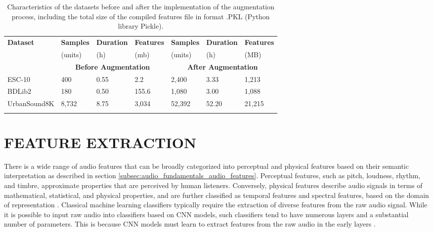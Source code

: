 \begin{table}[ht!]
    \caption[Comparison between the original datasets and their augmented versions]{Characteristics of the datasets before and after the implementation of the augmentation process, including the total size of the compiled features file in format .PKL (Python library Pickle).}
    \label{table:summary_datasets_before_and_after_augmentation}
    \centering
    \begin{tabular}{p{2.7cm}|p{1.6cm}|p{1.7cm}|p{1.7cm}|p{1.6cm}|p{1.7cm}|p{1.7cm}}
        \Xhline{2\arrayrulewidth} 
        \rowcolor{lightgray}
        \textbf{Dataset} & \hfil\textbf{Samples} & \hfil\textbf{Duration} & \hfil\textbf{Features} & \hfil\textbf{Samples} & \hfil\textbf{Duration} & \hfil\textbf{Features}\\
        \rowcolor{lightgray}
          & \hfil (units) & \hfil (h) & \hfil (\gls{m}\gls{b}) & \hfil(units) & \hfil(h) & \hfil(MB)\\    
        \Xhline{2\arrayrulewidth}
        \rowcolor{gray!20} & \multicolumn{3}{c|}{\textbf{Before Augmentation}} & \multicolumn{3}{c}{\textbf{After Augmentation}} \\
        \hline
        ESC-10 & \hfil 400 & \hfil 0.55 & \hfil 2.2 & \hfil 2,400 & \hfil 3.33 & \hfil 1,213\\
        BDLib2 & \hfil 180 & \hfil 0.50 & \hfil 155.6 & \hfil 1,080 & \hfil 3.00 & \hfil 1,088\\
        UrbanSound8K & \hfil 8,732 & \hfil 8.75 & \hfil 3,034 & \hfil 52,392 & \hfil 52.20 & \hfil 21,215\\
        \Xhline{2\arrayrulewidth}
    \end{tabular}
\end{table}


\section{FEATURE EXTRACTION}
\label{sec:methods_feature_extraction}

There is a wide range of audio features that can be broadly categorized into perceptual and physical features based on their semantic interpretation as described in section \ref{subsec:audio_fundamentals_audio_features}. Perceptual features, such as pitch, loudness, rhythm, and timbre, approximate properties that are perceived by human listeners. Conversely, physical features describe audio signals in terms of mathematical, statistical, and physical properties, and are further classified as temporal features and spectral features, based on the domain of representation \cite{Lhoest2021}. Classical machine learning classifiers typically require the extraction of diverse features from the raw audio signal. While it is possible to input raw audio into classifiers based on CNN models, such classifiers tend to have numerous layers and a substantial number of parameters. This is because CNN models must learn to extract features from the raw audio in the early layers \cite{Chu2023}.

